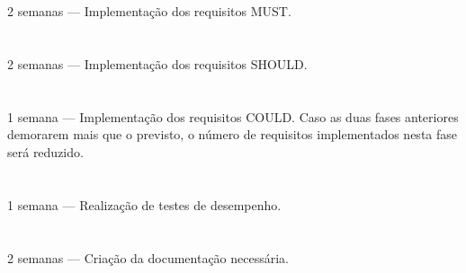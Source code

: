 \documentclass{article}
\begin{document}
\paragraph{}
    \textbf{}\\
    2 semanas --- Implementação dos requisitos MUST.
\paragraph{}
    \textbf{}\\
    2 semanas --- Implementação dos requisitos SHOULD.
\paragraph{}
    \textbf{}\\
    1 semana --- Implementação dos requisitos COULD. Caso as duas fases anteriores demorarem mais que o previsto, o número de requisitos implementados nesta fase será reduzido.
\paragraph{}
    \textbf{}\\
    1 semana --- Realização de testes de desempenho.
\paragraph{}
    \textbf{}\\
    2 semanas --- Criação da documentação necessária.
\end{document}
